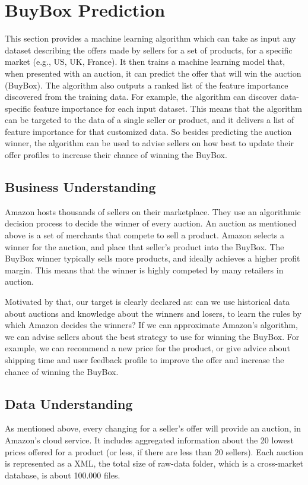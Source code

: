 \chapter{BuyBox Prediction}
\label{sec:buybox}
This section provides a machine learning algorithm which can take as input any dataset describing the 
offers made by sellers for a set of products, for a specific market (e.g., US, UK, France). 
It then trains a machine learning model that, when presented with an auction, it can predict the offer that 
will win the auction (BuyBox). The algorithm also outputs a ranked list of the feature importance discovered 
from the training data. For example, the algorithm can discover data-specific feature importance for each input dataset. 
This means that the algorithm can be targeted to the data of a single seller or product, and it delivers a list of feature importance 
for that customized data. So besides predicting the auction winner, the algorithm can be used to advise sellers on how best to update 
their offer profiles to increase their chance of winning the BuyBox.

\section{Business Understanding}
\label{sec:bbbusiness}
Amazon hosts thousands of  sellers on their marketplace. They use an algorithmic decision process to decide the winner of every auction. 
An auction as mentioned above is a set of merchants that compete to sell a product. Amazon selects a winner for the auction, and place that 
seller's product into the BuyBox. The BuyBox winner typically sells more products, and ideally achieves a higher profit margin. 
This means that the winner is highly competed by many retailers in auction.

Motivated by that, our target is clearly declared as: can we use historical data about auctions and knowledge about the winners and losers, to learn the rules by which Amazon decides the winners? 
If we can approximate Amazon’s algorithm, we can advise sellers about the best strategy to use for winning the BuyBox. 
For example, we can recommend a new price for the product, or give advice about shipping time and user feedback profile to improve the offer and increase the chance of winning the BuyBox. 

\section{Data Understanding}
\label{sec:datafirstlook}
As mentioned above, every changing for a seller's offer will provide an auction, in Amazon's cloud service. 
It includes aggregated information about the 20 lowest prices offered for a product (or less, if there are less than 20 sellers). 
Each auction is represented as a XML, the total size of raw-data folder, which is a cross-market database, is about 100.000 files. 

